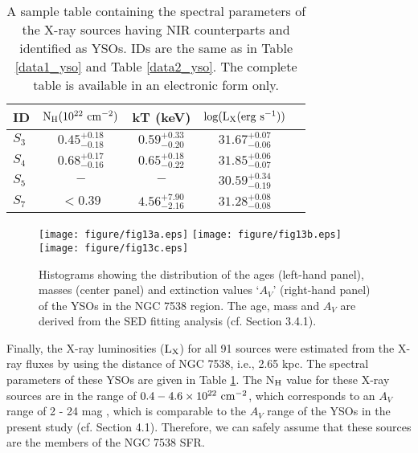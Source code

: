 \documentclass[a4paper,fleqn,usenatbib,useAMS]{mnras}
\begin{document}
\begin{table}
\caption{\label{xray-param}  A sample table containing the spectral parameters of the X-ray sources having NIR counterparts and identified as YSOs. 
IDs are the same as in Table \ref{data1_yso} and Table \ref{data2_yso}.
The complete table is available in an electronic form only.
}
\begin{tabular}{lcccc}
\hline
ID     &  $\rm{N_H (10^{22}~cm^{-2})}$    &  kT (keV)             &   $\rm log({{L_X} (erg~s^{-1})})$ \\
\hline
$S_3$   & $      0.45^{+0.18}_{-0.18} $&$  0.59^{+0.33}_{-0.20}    $&$  31.67_{-0.06}^{+0.07}$\\
$S_4$   & $      0.68^{+0.17}_{-0.16} $&$  0.65^{+0.18}_{-0.22}    $&$  31.85_{-0.07}^{+0.06}$\\
$S_5$   & $       -                   $&$  -                       $&$  30.59_{-0.19}^{+0.34}$\\
$S_7$   & $     <0.39                 $&$  4.56^{+7.90}_{-2.16}    $&$  31.28_{-0.08}^{+0.08}$\\
\hline
\end{tabular}
\end{table} 

\begin{figure*}
\centering\texttt{[image: figure/fig13a.eps]}
\centering\texttt{[image: figure/fig13b.eps]}
\centering\texttt{[image: figure/fig13c.eps]}
\caption{\label{histogram} Histograms showing the distribution of the ages (left-hand panel),
masses (center panel) and extinction values `$A_V$'  (right-hand panel) of the YSOs in the NGC 7538 region.
The age, mass and $A_V$ are derived from the SED fitting analysis (cf. Section 3.4.1).
}
\end{figure*}


Finally, the X-ray luminosities ($\rm{L_X}$) for all 91 sources were estimated from the X-ray fluxes
by using the distance of NGC 7538, i.e., 2.65 kpc.
The spectral parameters of these YSOs are given in Table \ref{xray-param}.
The N$\rm _H$ value for these  X-ray sources are in the range of $0.4 - 4.6 \times 10^{22}~ \rm cm^{-2}$,
which corresponds to an $A_V$ range of 2 - 24 mag \citep[$\rm N_H$ = 1.87 $\times$ 10$^{21} A_V$,][]{1978ApJ...224..132B},
which is comparable to the $A_V$ range of the YSOs in the present study (cf. Section 4.1).
Therefore, we can safely assume  that these sources are the members of the NGC 7538 SFR.
\end{document}
